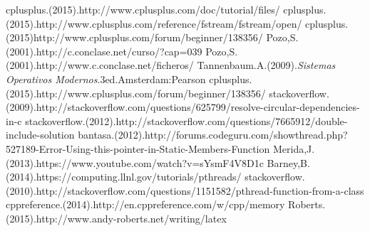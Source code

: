 \documentclass[twocolumn,showkeys,eqsecnum,prd,showpacs,notitlepage,9pt]{article}
\begin{document}
\begin{thebibliography}{X}

 cplusplus.(2015).http://www.cplusplus.com/doc/tutorial/files/
 cplusplus.(2015).http://www.cplusplus.com/reference/fstream/fstream/open/
 cplusplus.(2015)http://www.cplusplus.com/forum/beginner/138356/
 Pozo,S.(2001).http://c.conclase.net/curso/?cap=039
 Pozo,S.(2001).http://www.c.conclase.net/ficheros/
 Tannenbaum.A.(2009).\emph{Sistemas Operativos Modernos}.3ed.Amsterdam:Pearson
 cplusplus.(2015).http://www.cplusplus.com/forum/beginner/138356/
 stackoverflow.(2009).http://stackoverflow.com/questions/625799/resolve-circular-dependencies-in-c
 stackoverflow.(2012).http://stackoverflow.com/questions/7665912/double-include-solution
 bantasa.(2012).http://forums.codeguru.com/showthread.php?527189-Error-Using-this-pointer-in-Static-Members-Function
 Merida,J.(2013).https://www.youtube.com/watch?v=sYsmF4V8D1c
 Barney,B.(2014).https://computing.llnl.gov/tutorials/pthreads/
stackoverflow.(2010).http://stackoverflow.com/questions/1151582/pthread-function-from-a-class
 cppreference.(2014).http://en.cppreference.com/w/cpp/memory
  Roberts.(2015).http://www.andy-roberts.net/writing/latex




\end{thebibliography}


\pagestyle{fancy} 
\end{document}
